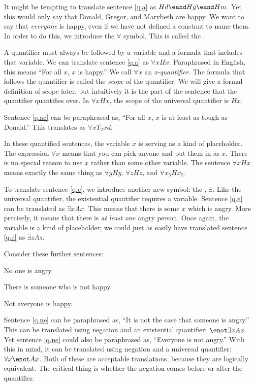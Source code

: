 It might be tempting to translate sentence \ref{q.a} as $Hd \eand Hg \eand Hm$. Yet this would only say that Donald, Gregor, and Marybeth are happy. We want to say that \emph{everyone} is happy, even if we have not defined a constant to name them. In order to do this, we introduce the $\forall$ symbol. This is called the .

A quantifier must always be followed by a variable and a formula that includes that variable. We can translate sentence \ref{q.a} as $\forall x Hx$. Paraphrased in English, this means ``For all $x$, $x$ is happy.''
We call $\forall x$ an \emph{x-quantifier}. The formula that follows the quantifier is called the \emph{scope} of the quantifier. We will give a formal definition of scope later, but intuitively it is the part of the sentence that the quantifier quantifies over. In $\forall x Hx$, the scope of the universal quantifier is $Hx$.

Sentence \ref{q.ac} can be paraphrased as, ``For all $x$, $x$ is at least as tough as Donald.'' This translates as $\forall x T_2xd$.

In these quantified sentences, the variable $x$ is serving as a kind of placeholder. The expression $\forall x$ means that you can pick anyone and put them in as $x$. There is no special reason to use $x$ rather than some other variable. The sentence $\forall x Hx$ means exactly the same thing as $\forall y Hy$, $\forall z Hz$, and $\forall x_5 Hx_5$.

To translate sentence \ref{q.e}, we introduce another new symbol: the , $\exists$. Like the universal quantifier, the existential quantifier requires a variable. Sentence \ref{q.e} can be translated as $\exists x Ax$. This means that there is some $x$ which is angry. More precisely, it means that there is \emph{at least one} angry person. Once again, the variable is a kind of placeholder; we could just as easily have translated sentence \ref{q.e} as $\exists z Az$.

Consider these further sentences:
\begin{kormanize}
\item[\ex{q.ne}] No one is angry.
\item[\ex{q.en}] There is someone who is not happy.
\item[\ex{q.na}] Not everyone is happy.
\end{kormanize}

Sentence \ref{q.ne} can be paraphrased as, ``It is not the case that someone is angry.'' This can be translated using negation and an existential quantifier: $\enot \exists x Ax$. Yet sentence \ref{q.ne} could also be paraphrased as, ``Everyone is not angry.'' With this in mind, it can be translated using negation and a universal quantifier: $\forall x \enot Ax$. Both of these are acceptable translations, because they are logically equivalent. The critical thing is whether the negation comes before or after the quantifier.

